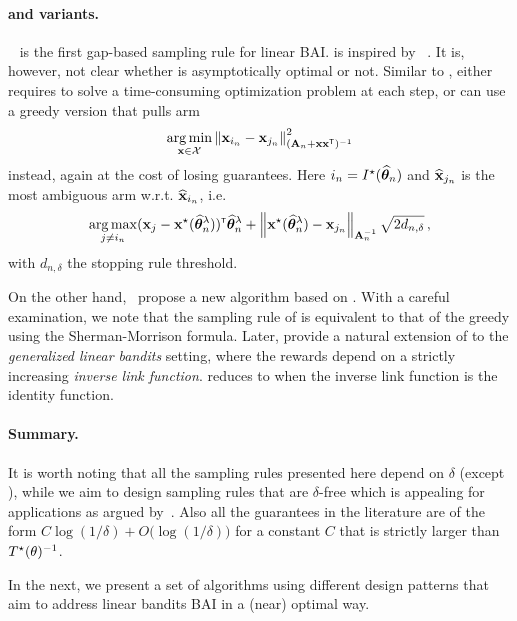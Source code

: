 \paragraph{\LGapE and variants.} \LGapE~\citep{xu2018linear} is the first gap-based sampling rule for linear BAI. \LGapE is inspired by \UGapE~\citep{gabillon2012ugape}. It is, however, not clear whether \LGapE is asymptotically optimal or not. Similar to \XYS, \LGapE either requires to solve a time-consuming optimization problem at each step, or can use a greedy version that pulls arm 
\[
    \operatorname*{arg\,min}_{{\bf x}\in\mathcal{X}} \left\lVert{\bf x}_{i_n}-{\bf x}_{j_n}\right\rVert_{({\bf A}_n+{\bf x}{\bf x}^\mathsf{\scriptscriptstyle T})^{-1}}^2
\]
instead, again at the cost of losing guarantees. Here $i_n = I^\star(\widehat{{\boldsymbol \theta}}_n)$ and $\widehat{{\bf x}}_{j_n}$ is the most ambiguous arm w.r.t. $\widehat{{\bf x}}_{i_n}$, i.e. 
\[
    \operatorname*{arg\,max}_{j\neq i_n} ({\bf x}_{j}-{\bf x}^\star(\widehat{{\boldsymbol \theta}}_n^\lambda))^\mathsf{\scriptscriptstyle T}\widehat{{\boldsymbol \theta}}_n^\lambda + \left\lVert{\bf x}^\star(\widehat{{\boldsymbol \theta}}_n^\lambda) - {\bf x}_{j_n}\right\rVert_{{\bf A}_n^{-1}} \sqrt{2d_{n,\delta}}\,,
\]
with $d_{n,\delta}$ the stopping rule threshold.

On the other hand,~\citet{zaki2019maxoverlap} propose a new algorithm based on \LUCB. With a careful examination, we note that the sampling rule of \GLUCB is equivalent to that of the greedy \LGapE using the Sherman-Morrison formula. Later, \citet{kazerouni2019glb} provide a natural extension of \LGapE to the \emph{generalized linear bandits} setting, where the rewards depend on a strictly increasing \emph{inverse link function}. \GLGapE reduces to \LGapE when the inverse link function is the identity function.

\paragraph{Summary.}
It is worth noting that all the sampling rules presented here depend on $\delta$ (except \XYS), while we aim to design sampling rules that are $\delta$-free which is appealing for applications as argued by~\citet{jun2016atlucb}. Also all the guarantees in the literature are of the form $C\log(1/\delta) + O\big(\log(1/\delta)\big)$ for a constant $C$ that is strictly larger than $T^{\star}(\theta)^{-1}$.

In the next, we present a set of algorithms using different design patterns that aim to address linear bandits BAI in a (near) optimal way.
